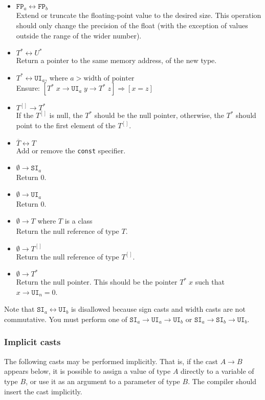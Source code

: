 \documentclass{article}
\newcommand{\R}[1]{\mathtt{#1}}
\newcommand{\both}{\leftrightarrow}
\begin{document}
\begin{itemize}
  \item{$\R{FP}_a \both \R{FP}_b$ \\
    Extend or truncate the floating-point value to the desired size. This
    operation should only change the precision of the float (with the exception
    of values outside the range of the wider number).}
  \item{$T^* \both U^*$ \\
    Return a pointer to the same memory address, of the new type.}
  \item{$T^* \both \R{UI}_a$, where $a > \textrm{width of pointer}$ \\
    Ensure: $[T^*\;x \to \R{UI}_a\;y \to T^*\;z] \Rightarrow [x = z]$}
  \item{$T^{[]} \to T^*$ \\
    If the $T^{[]}$ is null, the $T^*$ should be the null pointer, otherwise,
    the $T^*$ should point to the first element of the $T^{[]}$.}
  \item{$\overline{T} \both T$ \\
    Add or remove the \texttt{const} specifier.}
  \item{$\emptyset \to \R{SI}_a$ \\
    Return $0$.}
  \item{$\emptyset \to \R{UI}_a$ \\
    Return $0$.}
  \item{$\emptyset \to T$ where $T$ is a class \\
    Return the null reference of type $T$.}
  \item{$\emptyset \to T^{[]}$ \\
    Return the null reference of type $T^{[]}$.}
  \item{$\emptyset \to T^*$ \\
    Return the null pointer. This should be the pointer $T^*\;x$ such that
    $x \to \R{UI}_n = 0$.}
\end{itemize}
Note that $\R{SI}_a \both \R{UI}_b$ is disallowed because sign casts and width
casts are not commutative. You must perform one of
$\R{SI}_a \to \R{UI}_a \to \R{UI}_b$ or $\R{SI}_a \to \R{SI}_b \to \R{UI}_b$.

\subsubsection{Implicit casts}
The following casts may be performed implicitly. That is, if the cast
$A \to B$ appears below, it is possible to assign a value of type $A$ directly
to a variable of type $B$, or use it as an argument to a parameter of type
$B$. The compiler should insert the cast implicitly.
\end{document}
